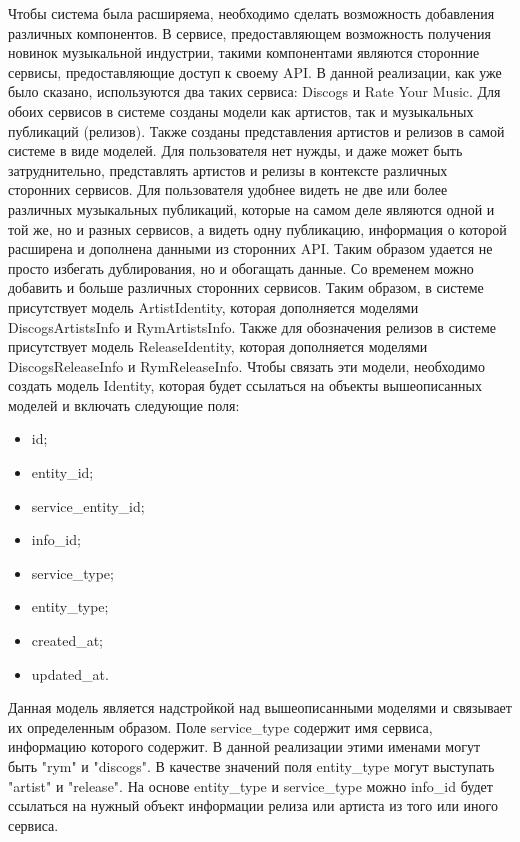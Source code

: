Чтобы система была расширяема, необходимо сделать возможность добавления различных компонентов. В сервисе, предоставляющем возможность получения новинок музыкальной индустрии, такими компонентами являются сторонние сервисы, предоставляющие доступ к своему API. В данной реализации, как уже было сказано, используются два таких сервиса: Discogs и Rate Your Music. Для обоих сервисов в системе созданы модели как артистов, так и музыкальных публикаций (релизов). Также созданы представления артистов и релизов в самой системе в виде моделей. Для пользователя нет нужды, и даже может быть затруднительно, представлять артистов и релизы в контексте различных сторонних сервисов. Для пользователя удобнее видеть не две или более различных музыкальных публикаций, которые на самом деле являются одной и той же, но и разных сервисов, а видеть одну публикацию, информация о которой расширена и дополнена данными из сторонних API. Таким образом удается не просто избегать дублирования, но и обогащать данные. Со временем можно добавить и больше различных сторонних сервисов. Таким образом, в системе присутствует модель ArtistIdentity, которая дополняется моделями DiscogsArtistsInfo и RymArtistsInfo. Также для обозначения релизов в системе присутствует модель ReleaseIdentity, которая дополняется моделями DiscogsReleaseInfo и RymReleaseInfo. Чтобы связать эти модели, необходимо создать модель Identity, которая будет ссылаться на объекты вышеописанных моделей и включать следующие поля:

\begin{itemize}
  \item id;
  \item entity\_id;
  \item service\_entity\_id;
  \item info\_id;
  \item service\_type;
  \item entity\_type;
  \item created\_at;
  \item updated\_at.
\end{itemize}

Данная модель является надстройкой над вышеописанными моделями и связывает их определенным образом. Поле service\_type содержит имя сервиса, информацию которого содержит. В данной реализации этими именами могут быть "rym" и "discogs". В качестве значений поля entity\_type могут выступать "artist" и "release". На основе entity\_type и service\_type можно info\_id будет ссылаться на нужный объект информации релиза или артиста из того или иного сервиса.

